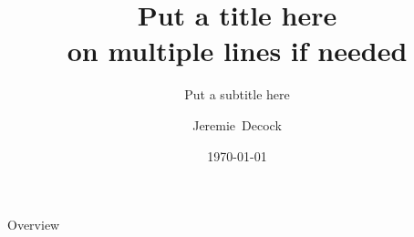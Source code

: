 






\title{Put a title here\\on multiple lines if needed}
\subtitle{Put a subtitle here}

\author[Decock]{Jeremie~Decock}


\date{\today}

\subject{The subject of the presentation}






\begin{frame}
    \titlepage
\end{frame}
\note{
}






\begin{frame}{Overview}
    \tableofcontents[hideallsubsections]
\end{frame}
\note{
}












